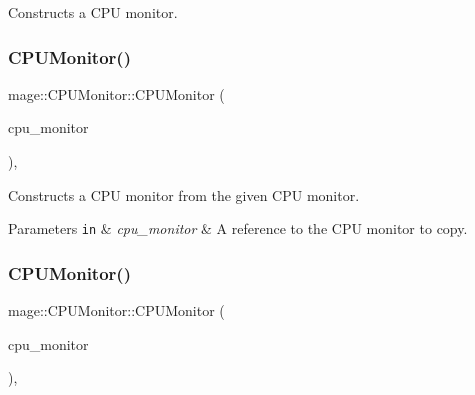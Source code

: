 Constructs a C\+PU monitor. \mbox{\label{classmage_1_1_c_p_u_monitor_a8d53a4b373c63d074fcb0cb969b3f7cb}} 
\subsubsection{\texorpdfstring{C\+P\+U\+Monitor()}{CPUMonitor()}\hspace{0.1cm}{\footnotesize\ttfamily [2/3]}}
{\footnotesize\ttfamily mage\+::\+C\+P\+U\+Monitor\+::\+C\+P\+U\+Monitor (\begin{DoxyParamCaption}\item[{const \mbox{\hyperlink{classmage_1_1_c_p_u_monitor}{C\+P\+U\+Monitor}} \&}]{cpu\+\_\+monitor }\end{DoxyParamCaption})\hspace{0.3cm}{\ttfamily [default]}, {\ttfamily [noexcept]}}

Constructs a C\+PU monitor from the given C\+PU monitor.


\begin{DoxyParams}[1]{Parameters}
\mbox{\tt in}  & {\em cpu\+\_\+monitor} & A reference to the C\+PU monitor to copy. \\
\hline
\end{DoxyParams}
\mbox{\label{classmage_1_1_c_p_u_monitor_a415f77c86323428f233f955249f5b252}} 
\subsubsection{\texorpdfstring{C\+P\+U\+Monitor()}{CPUMonitor()}\hspace{0.1cm}{\footnotesize\ttfamily [3/3]}}
{\footnotesize\ttfamily mage\+::\+C\+P\+U\+Monitor\+::\+C\+P\+U\+Monitor (\begin{DoxyParamCaption}\item[{\mbox{\hyperlink{classmage_1_1_c_p_u_monitor}{C\+P\+U\+Monitor}} \&\&}]{cpu\+\_\+monitor }\end{DoxyParamCaption})\hspace{0.3cm}{\ttfamily [default]}, {\ttfamily [noexcept]}}

